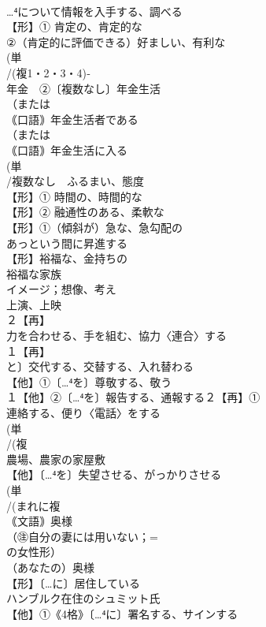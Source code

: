 \documentclass[8pt]{extreport}
\begin{document}
\begin{CJK}{UTF8}{min}
\\	…⁴について情報を入手する、調べる
\\	【形】① 肯定の、肯定的な 
\\	②（肯定的に評価できる）好ましい、有利な
\\	(単
\\	/(複1・2・3・4)‐
\\	年金　②〔複数なし〕年金生活 
\\	（または
\\	｟口語｠年金生活者である 
\\	（または
\\	｟口語｠年金生活に入る
\\	(単
\\	/複数なし　ふるまい、態度 
\\	【形】① 時間の、時間的な 
\\	【形】② 融通性のある、柔軟な 
\\	【形】①（傾斜が）急な、急勾配の 
\\	あっという間に昇進する 
\\	【形】裕福な、金持ちの 
\\	裕福な家族 
\\	イメージ；想像、考え 
\\	上演、上映
\\	２【再】
\\	力を合わせる、手を組む、協力〈連合〉する 
\\	１【再】
\\	と〕交代する、交替する、入れ替わる 
\\	【他】①〔…⁴を〕尊敬する、敬う 
\\	１【他】②〔…⁴を〕報告する、通報する２【再】①
\\	連絡する、便り〈電話〉をする
\\	(単
\\	/(複
\\	農場、農家の家屋敷 
\\	【他】〔…⁴を〕失望させる、がっかりさせる 
\\	(単
\\	/(まれに複
\\	｟文語｠奥様 
\\	（㊟自分の妻には用いない；=
\\	の女性形） 
\\	（あなたの）奥様
\\	【形】〔…に〕居住している 
\\	ハンブルク在住のシュミット氏
\\	【他】①《4格》〔…⁴に〕署名する、サインする 

\end{CJK}
\end{document}
